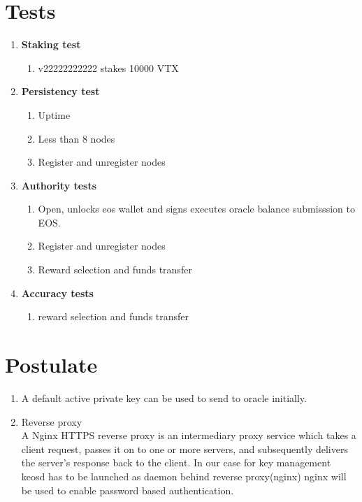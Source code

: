 \documentclass[]{article}
\begin{document}
\section{Tests}
					\begin{enumerate}
						\item \textbf{Staking test}
						\begin{enumerate}
							\item v22222222222 stakes 10000 VTX
						\end{enumerate}
						\item \textbf{Persistency test}
							\begin{enumerate}
								\item Uptime\textit{}
								\item Less than 8 nodes 
								\item Register and unregister nodes
							\end{enumerate}
						\item \textbf{Authority tests}
							\begin{enumerate}
							\item Open, unlocks eos wallet and signs executes oracle balance submisssion to EOS.
							\item Register and unregister nodes
							\item Reward selection and funds transfer	
						\end{enumerate}
											\item \textbf{Accuracy tests}
													\begin{enumerate}
															\item reward selection and funds transfer	
													\end{enumerate}
				\end{enumerate}
\section{Postulate}
\begin{enumerate}
	\item A default active private key can be used to send to oracle initially.
	\item Reverse proxy \\
	A Nginx HTTPS reverse proxy is an intermediary proxy service which takes a client request, passes it on to one or more servers, and subsequently delivers the server's response back to the client. 
	In our case for key management keosd has to be launched as daemon behind reverse proxy(nginx)
	nginx will be used to enable password based authentication.
\end{enumerate}
\end{document}
